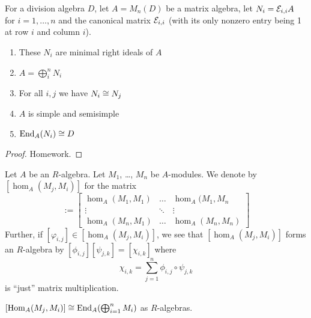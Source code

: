 \begin{example}\label{ex:3.16}
For a division algebra $D$, let $A=M_{n}(D)$ be a matrix algebra, let
$N_{i}=\mathcal{E}_{i,i}A$ for $i=1,\dots,n$ and the canonical matrix
$\mathcal{E}_{i,i}$ (with its only nonzero entry being 1 at row $i$
and column $i$).
\begin{enumerate}
\item These $N_{i}$ are minimal right ideals of $A$
\item $A=\bigoplus^{n}_{i}N_{i}$
\item For all $i,j$ we have $N_{i}\cong N_{j}$
\item $A$ is simple and semisimple
\item $\operatorname{End}_{A}(N_{i})\cong D$
\end{enumerate}
\end{example}

\begin{proof}
Homework.
\end{proof}

\begin{notation}
Let $A$ be an $R$-algebra. Let $M_{1}$, \dots, $M_{n}$ be $A$-modules.
We denote by $[\hom_{A}(M_{j},M_{i})]$ for the matrix
\begin{equation}
[\hom_{A}(M_{j},M_{i})]:=\begin{bmatrix}\hom_{A}(M_{1},M_{1}) & \dots
& \hom_{A}(M_{1},M_{n}\\
\vdots & \ddots & \vdots\\
\hom_{A}(M_{n},M_{1}) & \dots & \hom_{A}(M_{n},M_{n})
\end{bmatrix}
\end{equation}
Further, if $[\varphi_{i,j}]\in[\hom_{A}(M_{j},M_{i})]$, we see that
$[\hom_{A}(M_{j},M_{i})]$ forms an $R$-algebra by
$[\phi_{i,j}][\psi_{j,k}]=[\chi_{i,k}]$ where
\begin{equation}
\chi_{i,k}=\sum^{n}_{j=1}\phi_{i,j}\circ\psi_{j,k}
\end{equation}
is ``just'' matrix multiplication.
\end{notation}

\begin{proposition}\label{prop:3.17}
$[\operatorname{Hom}_{A}(M_{j},M_{i})]\cong\operatorname{End}_{A}(\bigoplus^{n}_{i=1}M_{i})$ as $R$-algebras.
\end{proposition}

